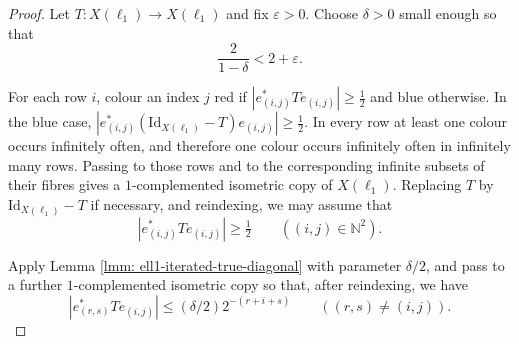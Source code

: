 \documentclass[11pt]{amsart}
\theoremstyle{plain}
\theoremstyle{definition}
\numberwithin{equation}{section}
\newcommand{\N}{\mathbb{N}}
\newcommand{\Id}{\mathrm{Id}}
\renewcommand{\leq}{\leqslant}
\renewcommand{\geq}{\geqslant}
\begin{document}
\begin{proof}
    Let $T \colon X(\ell_1) \to X(\ell_1)$ and fix $\varepsilon > 0$. Choose $\delta > 0$ small enough so that
    \begin{equation*}
        \frac{2}{1-\delta} < 2+\varepsilon.
    \end{equation*}

    For each row $i$, colour an index $j$ red if
    $|e^*_{(i,j)}Te_{(i,j)}|\geq\tfrac12$ and blue otherwise. In the blue case,
    $|e^*_{(i,j)}(\Id_{X(\ell_1)}-T)e_{(i,j)}|\geq\tfrac12$. In every row at least one colour occurs infinitely often, and therefore one colour occurs infinitely often in infinitely many rows. Passing to those rows and to the corresponding infinite subsets of their fibres gives a $1$-complemented isometric copy of $X(\ell_1)$. Replacing $T$ by $\Id_{X(\ell_1)}-T$ if necessary, and reindexing, we may assume that
    \begin{equation*}
        |e^*_{(i,j)} T e_{(i,j)}| \geq \tfrac12
        \qquad ((i,j)\in\N^2).
    \end{equation*}

    Apply Lemma \ref{lmm: ell1-iterated-true-diagonal} with parameter $\delta/2$, and pass to a further $1$-complemented isometric copy so that, after reindexing, we have
    \begin{equation*}
        |e^*_{(r,s)} T e_{(i,j)}|
        \leq
         (\delta/2) 2^{-(r+i+s)}
        \qquad ((r,s)\neq(i,j)).
    \end{equation*}


\end{proof}
\end{document}
